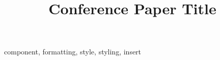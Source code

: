 \documentclass[conference]{IEEEtran-COPS}
\begin{document}
\title{Conference Paper Title}

\maketitle

\begin{abstract}

\end{abstract}

\begin{IEEEkeywords}
component, formatting, style, styling, insert
\end{IEEEkeywords}










\balance


\end{document}

